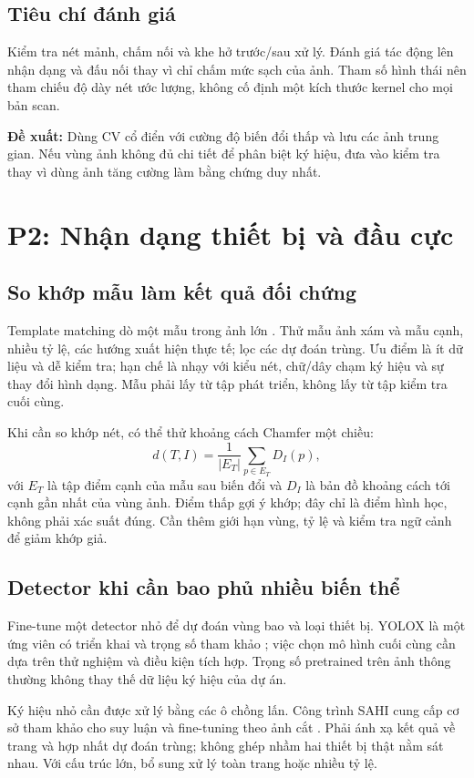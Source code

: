 \documentclass[11pt,a4paper]{article}
\newcommand{\decision}[1]{\par\smallskip\noindent\colorbox{Pale}{\parbox{\dimexpr\linewidth-2\fboxsep\relax}{\textbf{Đề xuất:} #1}}\par\smallskip}
\begin{document}
\subsection{Tiêu chí đánh giá}
Kiểm tra nét mảnh, chấm nối và khe hở trước/sau xử lý. Đánh giá tác động lên nhận dạng và đấu nối thay vì chỉ chấm mức sạch của ảnh. Tham số hình thái nên tham chiếu độ dày nét ước lượng, không cố định một kích thước kernel cho mọi bản scan.

\decision{Dùng CV cổ điển với cường độ biến đổi thấp và lưu các ảnh trung gian. Nếu vùng ảnh không đủ chi tiết để phân biệt ký hiệu, đưa vào kiểm tra thay vì dùng ảnh tăng cường làm bằng chứng duy nhất.}

\clearpage
\section{P2: Nhận dạng thiết bị và đầu cực}
\subsection{So khớp mẫu làm kết quả đối chứng}
Template matching dò một mẫu trong ảnh lớn \cite{template}. Thử mẫu ảnh xám và mẫu cạnh, nhiều tỷ lệ, các hướng xuất hiện thực tế; lọc các dự đoán trùng. Ưu điểm là ít dữ liệu và dễ kiểm tra; hạn chế là nhạy với kiểu nét, chữ/dây chạm ký hiệu và sự thay đổi hình dạng. Mẫu phải lấy từ tập phát triển, không lấy từ tập kiểm tra cuối cùng.

Khi cần so khớp nét, có thể thử khoảng cách Chamfer một chiều:
\begin{equation}
d(T,I)=\frac{1}{|E_T|}\sum_{p\in E_T}D_I(p),
\end{equation}
với $E_T$ là tập điểm cạnh của mẫu sau biến đổi và $D_I$ là bản đồ khoảng cách tới cạnh gần nhất của vùng ảnh. Điểm thấp gợi ý khớp; đây chỉ là điểm hình học, không phải xác suất đúng. Cần thêm giới hạn vùng, tỷ lệ và kiểm tra ngữ cảnh để giảm khớp giả.

\subsection{Detector khi cần bao phủ nhiều biến thể}
Fine-tune một detector nhỏ để dự đoán vùng bao và loại thiết bị. YOLOX là một ứng viên có triển khai và trọng số tham khảo \cite{yolox}; việc chọn mô hình cuối cùng cần dựa trên thử nghiệm và điều kiện tích hợp. Trọng số pretrained trên ảnh thông thường không thay thế dữ liệu ký hiệu của dự án.

Ký hiệu nhỏ cần được xử lý bằng các ô chồng lấn. Công trình SAHI cung cấp cơ sở tham khảo cho suy luận và fine-tuning theo ảnh cắt \cite{sahi}. Phải ánh xạ kết quả về trang và hợp nhất dự đoán trùng; không ghép nhầm hai thiết bị thật nằm sát nhau. Với cấu trúc lớn, bổ sung xử lý toàn trang hoặc nhiều tỷ lệ.
\end{document}
